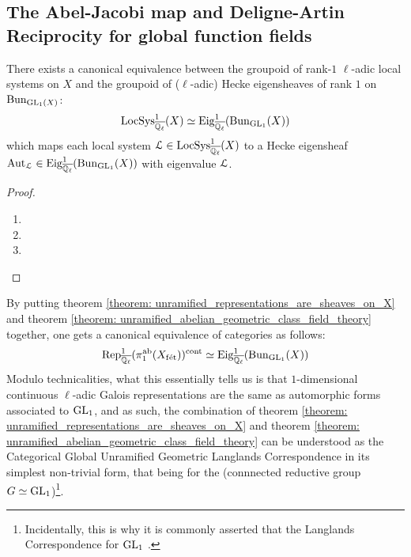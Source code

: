     \subsection{The Abel-Jacobi map and Deligne-Artin Reciprocity for global function fields}
        \begin{theorem} \label{theorem: unramified_abelian_geometric_class_field_theory}
            There exists a canonical equivalence between the groupoid of rank-$1$ $\ell$-adic local systems on $X$ and the groupoid of ($\ell$-adic) Hecke eigensheaves of rank $1$ on $\mathrm{Bun}_{\operatorname{GL}_1(X)}$:
                $$\mathrm{LocSys}_{\overline{\mathbb{Q}_{\ell}}}^1(X) \simeq \mathrm{Eig}^1_{\overline{\mathbb{Q}_{\ell}}}(\mathrm{Bun}_{\operatorname{GL}_1}(X))$$
            which maps each local system $\mathcal{L} \in \mathrm{LocSys}_{\overline{\mathbb{Q}_{\ell}}}^1(X)$ to a Hecke eigensheaf $\mathrm{Aut}_{\mathcal{L}} \in \mathrm{Eig}^1_{\overline{\mathbb{Q}_{\ell}}}(\mathrm{Bun}_{\operatorname{GL}_1}(X))$ with eigenvalue $\mathcal{L}$.
        \end{theorem}
            \begin{proof}
                \noindent
                \begin{enumerate}
                    \item 
                    \item
                    \item 
                \end{enumerate}
            \end{proof}
        \begin{remark} \label{remark: unramified_abelian_geometric_class_field_theory_explanation}
            By putting theorem \ref{theorem: unramified_representations_are_sheaves_on_X} and theorem \ref{theorem: unramified_abelian_geometric_class_field_theory} together, one gets a canonical equivalence of categories as follows:
                $$\mathrm{Rep}_{\overline{\mathbb{Q}_{\ell}}}^1(\pi_1^{\mathrm{ab}}(X_{\mathrm{f\acute{e}t}}))^{\mathrm{cont}} \simeq \mathrm{Eig}^1_{\overline{\mathbb{Q}_{\ell}}}(\mathrm{Bun}_{\operatorname{GL}_1}(X))$$
            Modulo technicalities, what this essentially tells us is that $1$-dimensional continuous $\ell$-adic Galois representations are the same as automorphic forms associated to $\operatorname{GL}_1$, and as such, the combination of theorem \ref{theorem: unramified_representations_are_sheaves_on_X} and theorem \ref{theorem: unramified_abelian_geometric_class_field_theory} can be understood as the Categorical Global Unramified Geometric Langlands Correspondence in its simplest non-trivial form, that being for the (connnected reductive group $G \simeq \operatorname{GL}_1$)\footnote{Incidentally, this is why it is commonly asserted that the Langlands Correspondence for $\operatorname{GL}_1$ .}. 
        \end{remark}
